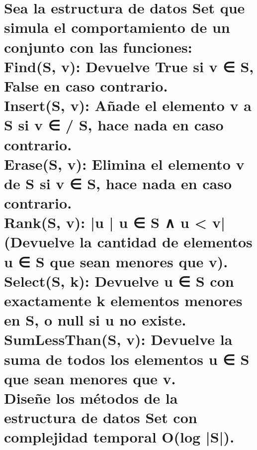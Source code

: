 \documentclass[10pt,a4paper]{article}
\begin{document}
    \section{ Sea la estructura de datos Set que simula el comportamiento de un conjunto con las funciones:\\
    Find(S, v): Devuelve True si v ∈ S, False en caso contrario.\\
    Insert(S, v): Añade el elemento v a S si v ∈
     / S, hace nada en caso contrario.\\
    Erase(S, v): Elimina el elemento v de S si v ∈ S, hace nada en caso contrario.\\
    Rank(S, v): |{u | u ∈ S ∧ u < v}| (Devuelve la cantidad de elementos u ∈ S que sean menores que v).\\
    Select(S, k): Devuelve u ∈ S con exactamente k elementos menores en S, o null si u no existe.\\
    SumLessThan(S, v): Devuelve la suma de todos los elementos u ∈ S que sean menores que v.\\
    Diseñe los métodos de la estructura de datos Set con complejidad temporal O(log |S|).\\
    }
    
\end{document}
